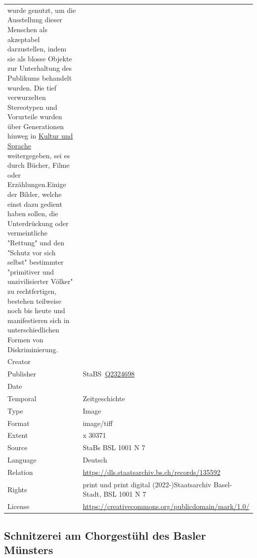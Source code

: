 \documentclass[
  letterpaper,
  DIV=11,
  numbers=noendperiod]{scrartcl}
\begin{document}
\begin{longtable}[]{@{}
  >{\raggedright\arraybackslash}p{}
  >{\raggedright\arraybackslash}p{}@{}}
wurde genutzt, um die Ausstellung dieser Menschen als akzeptabel
darzustellen, indem sie als blosse Objekte zur Unterhaltung des
Publikums behandelt wurden. Die tief verwurzelten Stereotypen und
Vorurteile wurden über Generationen hinweg in
\href{https://mirsindvoda.ch/voelkerschauen-in-der-schweiz/}{Kultur und
Sprache} weitergegeben, sei es durch Bücher, Filme oder
Erzählungen.Einige der Bilder, welche einst dazu gedient haben sollen,
die Unterdrückung oder vermeintliche "Rettung" und den "Schutz vor sich
selbst" bestimmter "primitiver und unzivilisierter Völker" zu
rechtfertigen, bestehen teilweise noch bis heute und manifestieren sich
in unterschiedlichen Formen von Diskriminierung. \\
Creator & \\
Publisher &
StaBS~\href{https://www.wikidata.org/wiki/Q2324698}{Q2324698} \\
Date & 1926 \\
Temporal & Zeitgeschichte \\
Type & Image \\
Format & image/tiff \\
Extent & 23376 x 30371 \\
Source & StaBs BSL 1001 N 7 \\
Language & Deutsch \\
Relation & \url{https://dls.staatsarchiv.bs.ch/records/135592} \\
Rights & print und print digital (2022-)Staatsarchiv Basel-Stadt, BSL
1001 N 7 \\
License & \url{https://creativecommons.org/publicdomain/mark/1.0/} \\
\end{longtable}

\subsection{Schnitzerei am Chorgestühl des Basler
Münsters}\label{schnitzerei-am-chorgestuxfchl-des-basler-muxfcnsters}
\end{document}
